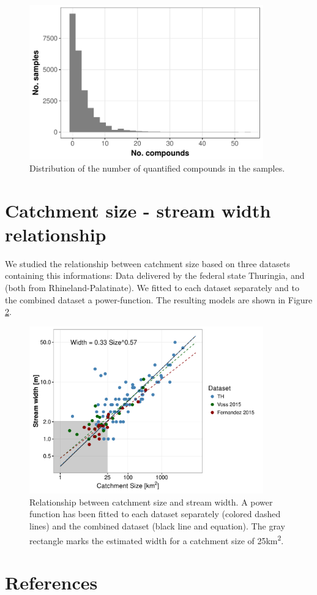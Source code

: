 \begin{figure}[ht]
	\centering
	\includegraphics[width = 0.9\textwidth]{appendix/smallstreams/one/pmix}
	\caption{Distribution of the number of quantified compounds in the samples.}
	\label{fig:pmix}
\end{figure}


\clearpage
\section{Catchment size - stream width relationship}
We studied the relationship between catchment size based on three datasets containing this informations:
Data delivered by the federal state Thuringia, \citet{vos_organic_2015} and \citet{fernandez_effects_2015} (both from Rhineland-Palatinate).
We fitted to each dataset separately and to the combined dataset a power-function.
The resulting models are shown in Figure \ref{fig:size_width}. 

\begin{figure}[ht]
	\centering
	\includegraphics[width = 0.9\textwidth]{appendix/smallstreams/one/width_size}
		\caption[Relationship between catchment size and stream width.]{Relationship between catchment size and stream width. A power function has been fitted to each dataset separately (colored dashed lines) and the combined dataset (black line and equation). The gray rectangle marks the estimated width for a catchment size of 25km\textsuperscript{2}.}
	\label{fig:size_width}
\end{figure}

\clearpage
\section{References}
\printbibliography[heading=none]

